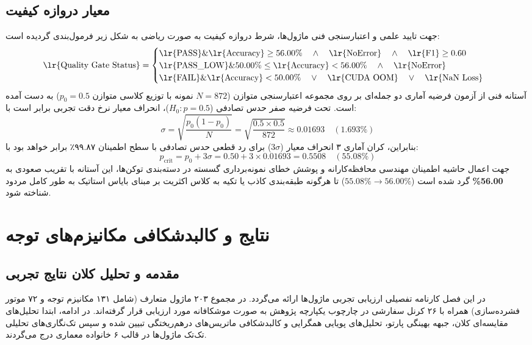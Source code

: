 \documentclass[12pt,a4paper]{report}
\theoremstyle{definition}
\begin{document}
\section{معیار دروازه کیفیت }
جهت تایید علمی و اعتبارسنجی فنی ماژول‌ها، شرط دروازه کیفیت به صورت ریاضی به شکل زیر فرمول‌بندی گردیده است:
\begin{equation}
\text{\lr{Quality Gate Status}} = \begin{cases}
\text{\lr{PASS}} \& \text{\lr{Accuracy}} \ge 56.00\% \quad \land \quad \text{\lr{NoError}} \quad \land \quad \text{\lr{F1}} \ge 0.60 \\
\text{\lr{PASS\_LOW}} \& 50.00\% \le \text{\lr{Accuracy}} < 56.00\% \quad \land \quad \text{\lr{NoError}} \\
\text{\lr{FAIL}} \& \text{\lr{Accuracy}} < 50.00\% \quad \lor \quad \text{\lr{CUDA OOM}} \quad \lor \quad \text{\lr{NaN Loss}}
\end{cases}
\end{equation}
آستانه فنی  از آزمون فرضیه آماری دو جمله‌ای بر روی مجموعه اعتبارسنجی متوازن  ($N = 872$ نمونه با توزیع کلاسی متوازن $p_0 = 0.5$) به دست آمده است. تحت فرضیه صفر حدس تصادفی ($H_0: p = 0.5$)، انحراف معیار نرخ دقت تجربی برابر است با:
\begin{equation}
\sigma = \sqrt{\frac{p_0 (1 - p_0)}{N}} = \sqrt{\frac{0.5 \times 0.5}{872}} \approx 0.01693 \quad (1.693\%)
\end{equation}
بنابراین، کران آماری ۳ انحراف معیار ($3\sigma$) برای رد قطعی حدس تصادفی با سطح اطمینان ۹۹.۸۷٪ برابر خواهد بود با:
\begin{equation}
p_{\text{crit}} = p_0 + 3\sigma = 0.50 + 3 \times 0.01693 = 0.5508 \quad (55.08\%)
\end{equation}
جهت اعمال حاشیه اطمینان مهندسی محافظه‌کارانه و پوشش خطای نمونه‌برداری گسسته در دسته‌بندی توکن‌ها، این آستانه با تقریب صعودی به \textbf{56.00\%} گرد شده است ($55.08\% \to 56.00\%$) تا هرگونه طبقه‌بندی کاذب یا تکیه به کلاس اکثریت بر مبنای بایاس استاتیک به طور کامل مردود شناخته شود.

\chapter{نتایج و کالبدشکافی مکانیزم‌های توجه}
\label{chap:results}

\section{مقدمه و تحلیل کلان نتایج تجربی}
در این فصل کارنامه تفصیلی ارزیابی تجربی ماژول‌ها ارائه می‌گردد. در مجموع ۲۰۳ ماژول متعارف (شامل ۱۳۱ مکانیزم توجه و ۷۲ موتور فشرده‌سازی) همراه با ۲۶ کرنل سفارشی  در چارچوب یکپارچه پژوهش به صورت موشکافانه مورد ارزیابی قرار گرفته‌اند. در ادامه، ابتدا تحلیل‌های مقایسه‌ای کلان، جبهه بهینگی پارتو، تحلیل‌های پویایی همگرایی و کالبدشکافی ماتریس‌های درهم‌ریختگی تبیین شده و سپس تک‌نگاری‌های تحلیلی تک‌تک ماژول‌ها در قالب ۶ خانواده معماری درج می‌گردند.
\end{document}
